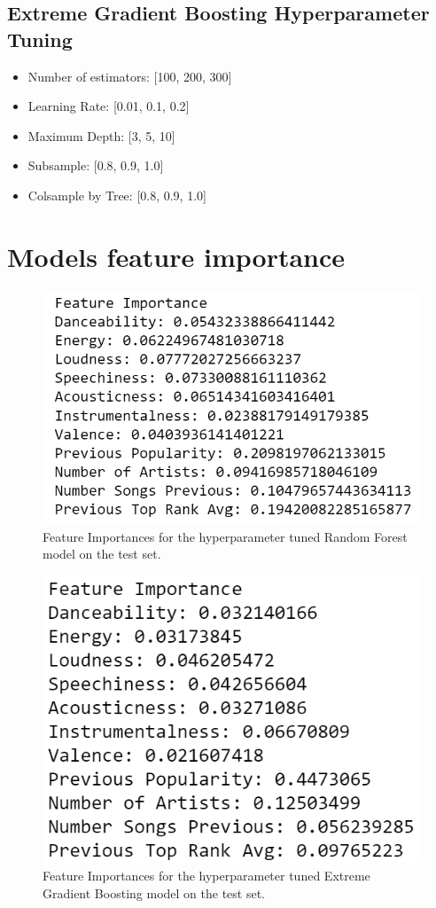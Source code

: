 \documentclass{article}
\begin{document}
\begin{appendices}
\subsection{Extreme Gradient Boosting Hyperparameter Tuning}
\begin{itemize}
    \item Number of estimators: [100, 200, 300]
    \item Learning Rate: [0.01, 0.1, 0.2]
    \item Maximum Depth: [3, 5, 10]
    \item Subsample: [0.8, 0.9, 1.0]
    \item Colsample by Tree: [0.8, 0.9, 1.0]
\end{itemize}


\section{Models feature importance}
\begin{figure}[h]
  \centering
  \includegraphics[width=0.5\linewidth]{RFFeatureImp.png}
  \caption{Feature Importances for the hyperparameter tuned Random Forest model on the test set.}
  \label{fig:dist}
\end{figure}


\begin{figure}[h]
  \centering
  \includegraphics[width=0.5\linewidth]{xgboostFeatImp.png}
  \caption{Feature Importances for the hyperparameter tuned Extreme Gradient Boosting model on the test set.}
  \label{fig:dist}
\end{figure}



\end{appendices}
\end{document}

